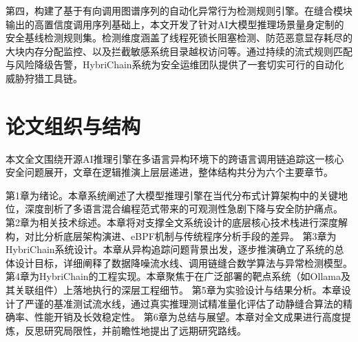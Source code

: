 第四，构建了基于有向调用图谱序列的自动化异常行为检测规则引擎。在缝合模块输出的高置信度调用序列基础上，本文开发了针对AI大模型推理场景量身定制的安全基线检测规则集。检测维度涵盖了线程死锁长阻塞检测、防范恶意显存耗尽的大块内存分配监控、以及拦截敏感系统目录越权访问等。通过持续的流式规则匹配与风险降级告警，HybriChain系统为安全运维团队提供了一套切实可行的自动化威胁狩猎工具链。

\section{论文组织与结构}

本文全文围绕开源AI推理引擎在多语言异构环境下的跨语言调用链追踪这一核心安全问题展开，文章在逻辑推演上层层递进，整体结构共分为六个主要章节。

第1章为绪论。本章系统阐述了大模型推理引擎在当代分布式计算架构中的关键地位，深度剖析了多语言混合编程范式带来的可观测性急剧下降与安全防护痛点。
第2章为相关技术综述。本章将对支撑全文系统设计的底层核心技术栈进行深度解构，对比分析底层架构演进、eBPF机制与传统程序分析手段的差异。
第3章为HybriChain系统设计。本章从异构追踪问题背景出发，逐步推演确立了系统的总体设计目标，详细阐释了数据降噪流水线、调用链缝合数学算法与异常检测模型。
第4章为HybriChain的工程实现。本章聚焦于在广泛部署的靶点系统（如Ollama及其关联组件）上落地执行的深层工程细节。
第5章为实验设计与结果分析。本章设计了严谨的基准测试流水线，通过真实推理测试精准量化评估了动静缝合算法的精确率、性能开销及长效稳定性。
第6章为总结与展望。本章对全文成果进行高度提炼，反思研究局限性，并前瞻性地提出了远期研究路线。
